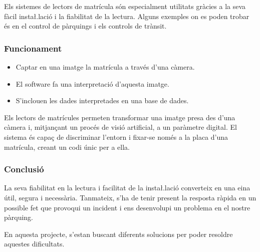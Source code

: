 Els sistemes de lectors de matrícula són
especialment utilitats gràcies a la seva fàcil insta\l.lació i la fiabilitat de
la lectura. Alguns exemples on es poden trobar és en el control de pàrquings i
els controls de trànsit.

\subsubsection{Funcionament}

\begin{itemize}
    \item Captar en una imatge la matrícula a través d'una càmera.
    \item El software fa una interpretació d'aquesta imatge.
    \item S'inclouen les dades interpretades en una base de dades.
\end{itemize}

Els lectors de matrícules permeten transformar una imatge presa
des d'una càmera i, mitjançant un procés de visió artificial, a un
paràmetre digital. El sistema és capaç de discriminar l'entorn i
fixar-se només a la placa d'una matrícula, creant un codi únic
per a ella.

\subsubsection{Conclusió}

La seva fiabilitat en la lectura i facilitat de la insta\l.lació
converteix en una eina útil, segura i necessària. Tanmateix, s'ha de tenir present
la resposta ràpida en un possible fet que provoqui un incident i ens desenvolupi un
problema en el nostre pàrquing.

En aquesta projecte, s'estan buscant diferents solucions per poder resoldre aquestes
dificultats.
